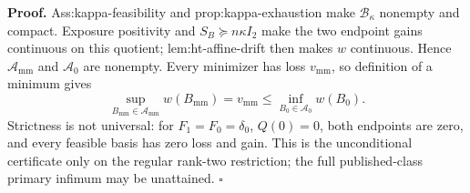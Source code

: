 \textbf{Proof.}
Ass:kappa-feasibility and prop:kappa-exhaustion make \(\mathcal B_\kappa\) nonempty and compact.  Exposure positivity and \(S_B\succeq n\kappa I_2\) make the two endpoint gains continuous on this quotient; lem:ht-affine-drift then makes \(w\) continuous.  Hence \(\mathcal A_{\mathrm{mm}}\) and \(\mathcal A_0\) are nonempty.  Every minimizer has loss \(v_{\mathrm{mm}}\), so definition of a minimum gives
\[
\sup_{B_{\mathrm{mm}}\in\mathcal A_{\mathrm{mm}}}w(B_{\mathrm{mm}})
=v_{\mathrm{mm}}
\le\inf_{B_0\in\mathcal A_0}w(B_0).
\]
Strictness is not universal: for \(F_1=F_0=\delta_0\), \(Q(0)=0\), both endpoints are zero, and every feasible basis has zero loss and gain.  This is the unconditional certificate only on the regular rank-two restriction; the full published-class primary infimum may be unattained. \(\square\)
